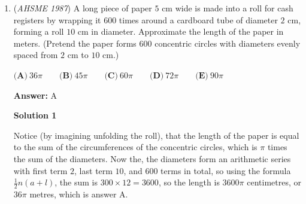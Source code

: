 \begin{enumerate}
 $B$: the boss delivers $1$, then delivers $2$, then the secretary does $2$, then the boss delivers $3$, then delivers $4$, then the secretary does $4$, then the secretary does $3$, then the boss delivers $5$, then the secretary does $5$, then the secretary does $1$.

 $C$: the boss delivers $1$, then delivers $2$, then delivers $3$, then the secretary does $3$, then does $2$, then the boss delivers $4$, then the secretary does $4$, then does $1$, then the boss delivers $5$, then the secretary does $5$.

 $E$: the boss delivers $1$, then $2$, then $3$, then $4$, then $5$, then the secretary does $5$, does $4$, etc. down to $1$.

 Hence the answer must be $\boxed{\text{D}}$. To give a complete proof, we need to show $D$ is impossible. In order for the secretary to start with $4$, the boss must deliver $1$, $2$, $3$, and $4$, then the secretary does $4$. To get $5$ next, the boss next delivers $5$, then the secretary does $5$, but now we can't get $2$, $3$, $1$: the remaining letters must start with $3$, which is on the top of the pile. Hence $D$ is impossible, as required.

 


	\item (\textit{AHSME 1987}) A long piece of paper $5$ cm wide is made into a roll for cash registers by wrapping it $600$ times around a cardboard tube of diameter $2$ cm, 
forming a roll $10$ cm in diameter. Approximate the length of the paper in meters. 
(Pretend the paper forms $600$ concentric circles with diameters evenly spaced from $2$ cm to $10$ cm.)


 $\textbf{(A)}\ 36\pi \qquad \textbf{(B)}\ 45\pi \qquad \textbf{(C)}\ 60\pi \qquad \textbf{(D)}\ 72\pi \qquad \textbf{(E)}\ 90\pi$

 \textbf{Answer: }A



\textbf{Solution 1}

Notice (by imagining unfolding the roll), that the length of the paper is equal to the sum of the circumferences of the concentric circles, which is $\pi$ times the sum of the diameters. Now the, the diameters form an arithmetic series with first term $2$, last term $10$, and $600$ terms in total, so using the formula $\frac{1}{2}n(a+l)$, the sum is $300 \times 12 = 3600$, so the length is $3600\pi$ centimetres, or $36\pi$ metres, which is answer $\boxed{\text{A}}$.

 




\end{enumerate}
